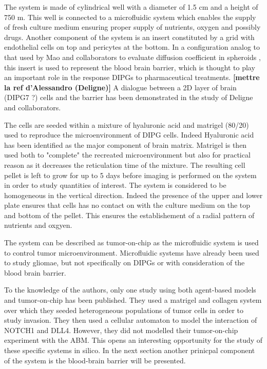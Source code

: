 \documentclass[11pt,a4paper]{article}
\begin{document}
The system is made of cylindrical well with a diameter of 1.5 cm and a height of 750 \textmu m. This well is connected to a microfluidic system which enables the supply of fresh culture medium ensuring proper supply of nutrients, oxygen and possibly drugs. Another component of the system is an insert constituted by a grid with endothelial cells on top and pericytes at the bottom. In a configuration analog to that used by Mao and collaborators to evaluate diffusion coefficient in spheroids \cite{Mao2018}, this insert is used to represent the blood brain barrier, which is thought to play an important role in the response DIPGs to pharmaceutical treatments. \textbf{[mettre la ref d'Alessandro (Deligne)]} A dialogue between a 2D layer of brain (DIPG7 ?) cells and the barrier has been demonstrated in the study of Deligne and collaborators.

The cells are seeded within a mixture of hyaluronic acid and matrigel (80/20) used to reproduce the microenvironment of DIPG cells. Indeed Hyaluronic acid has been identified as the major component of brain matrix. Matrigel is then used both to "complete" the recreated microenvironment but also for practical reason as it decreases the reticulation time of the mixture. The resulting cell pellet is left to grow for up to 5 days before imaging is performed on the system in order to study quantities of interest. The system is considered to be homogeneous in the vertical direction. Indeed the presence of the upper and lower plate ensures that cells has no contact on with the culture medium on the top and bottom of the pellet. This ensures the establishement of a radial pattern of nutrients and oxgyen.

The system can be described as tumor-on-chip as the microfluidic system is used to control tumor microenvironment. Microfluidic systems have already been used to study gliomae, but not specifically on DIPGs or with consideration of the blood brain barrier.\cite{Liu2021} 

To the knowledge of the authors, only one study using both agent-based models and tumor-on-chip has been published.\cite{Torab2021} They used a matrigel and collagen system over which they seeded heterogeneous populations of tumor cells in order to study invasion. They then used a cellular automaton to model the interaction of NOTCH1 and DLL4. However, they did not modelled their tumor-on-chip experiment with the ABM. This opens an interesting opportunity for the study of these specific systems in silico. In the next section another prinicpal component of the system is the blood-brain barrier will be presented.
\end{document}
